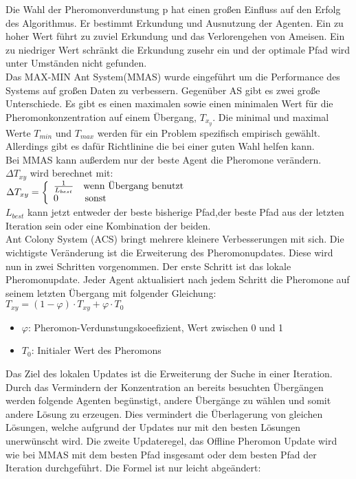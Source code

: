 Die Wahl der Pheromonverdunstung p hat einen großen Einfluss auf den Erfolg des Algorithmus. Er bestimmt Erkundung und Ausnutzung der Agenten. Ein zu hoher Wert führt zu zuviel Erkundung und das Verlorengehen von Ameisen. Ein zu niedriger Wert schränkt die Erkundung zusehr ein und der optimale Pfad wird unter Umständen nicht gefunden.\\
Das MAX-MIN Ant System(MMAS) wurde eingeführt um die Performance des Systems auf großen Daten zu verbessern. Gegenüber AS gibt es zwei große Unterschiede. Es gibt es einen maximalen sowie einen minimalen Wert für die Pheromonkonzentration auf einem Übergang, $T_x_y$. Die minimal und maximal Werte $T_{min}$ und $T_{max}$ werden für ein Problem spezifisch empirisch gewählt\cite{socha2002max}. Allerdings gibt es dafür Richtlinine die bei einer guten Wahl helfen kann\cite*{STUTZLE2000889}.\\
Bei MMAS kann außerdem nur der beste Agent die Pheromone verändern.\\
$\Delta T_{xy}$ wird berechnet mit:\\
\large
$\Delta T_{xy}  = \left\{
  \begin{array}{ll}
  \frac{1}{L_{best}} & \normalsize\textrm{wenn Übergang benutzt} \\
  0 & \, \normalsize \textrm{sonst} \\
  \end{array}
  \right. $
  \normalsize\\
$L_{best}$ kann jetzt entweder der beste bisherige Pfad,der beste Pfad aus der letzten Iteration sein oder eine Kombination der beiden.\\
Ant Colony System (ACS) bringt mehrere kleinere Verbesserungen mit sich. Die wichtigste Veränderung ist die Erweiterung des Pheromonupdates. Diese wird nun in zwei Schritten vorgenommen. Der erste Schritt ist das lokale Pheromonupdate. Jeder Agent aktualisiert nach jedem Schritt die Pheromone auf seinem letzten Übergang mit folgender Gleichung:\\
\large
$T_{xy}=(1-\varphi)\cdot T_{xy}+\varphi\cdot T_0$\\
\normalsize
\begin{itemize}
  \item $\varphi$: Pheromon-Verdunstungskoeefizient, Wert zwischen 0 und 1
  \item $T_0$: Initialer Wert des Pheromons
\end{itemize}
Das Ziel des lokalen Updates ist die Erweiterung der Suche in einer Iteration. Durch das Vermindern der Konzentration an bereits besuchten Übergängen werden folgende Agenten begünstigt, andere Übergänge zu wählen und somit andere Lösung zu erzeugen. Dies vermindert die Überlagerung von gleichen Lösungen, welche aufgrund der Updates nur mit den besten Lösungen unerwünscht wird\cite{dorigo1997ant}. Die zweite Updateregel, das Offline Pheromon Update wird wie bei MMAS mit dem besten Pfad insgesamt oder dem besten Pfad der Iteration durchgeführt. Die Formel ist nur leicht abgeändert:\\\\
